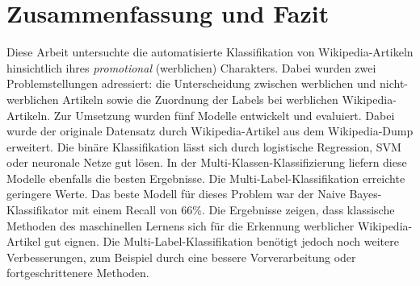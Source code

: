 \section{Zusammenfassung und Fazit}
\label{ZusammenfassungUndFazit}
Diese Arbeit untersuchte die automatisierte Klassifikation von Wikipedia-Artikeln hinsichtlich ihres \textit{promotional} (werblichen) Charakters. Dabei wurden zwei Problemstellungen adressiert: die Unterscheidung zwischen werblichen und nicht-werblichen Artikeln sowie die Zuordnung der Labels bei werblichen Wikipedia-Artikeln. Zur Umsetzung wurden fünf Modelle entwickelt und evaluiert. Dabei wurde der originale Datensatz durch Wikipedia-Artikel aus dem Wikipedia-Dump erweitert. Die binäre Klassifikation lässt sich durch logistische Regression, SVM oder neuronale Netze gut lösen. In der Multi-Klassen-Klassifizierung liefern diese Modelle ebenfalls die besten Ergebnisse. Die Multi-Label-Klassifikation erreichte geringere Werte. Das beste Modell für dieses Problem war der Naive Bayes-Klassifikator mit einem Recall von 66\%. Die Ergebnisse zeigen, dass klassische Methoden des maschinellen Lernens sich für die Erkennung werblicher Wikipedia-Artikel gut eignen. Die Multi-Label-Klassifikation benötigt jedoch noch weitere Verbesserungen, zum Beispiel durch eine bessere Vorverarbeitung oder fortgeschrittenere Methoden.
